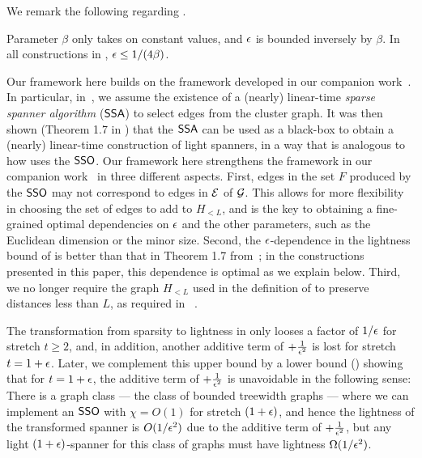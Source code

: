 We remark the following regarding .

\begin{remark}\label{remark:ACTIntro}  Parameter $\beta$ only takes on constant values, and $\epsilon$ is bounded inversely by  $\beta$. In all constructions in , $\epsilon \leq 1/(4\beta)$.
\end{remark}

Our framework here builds on the framework developed in our companion work~\cite{LS21}. In particular, in~\cite{LS21}, we assume the existence of a (nearly) linear-time \emph{sparse spanner algorithm} ($\mathsf{SSA}$) to select edges from the cluster graph.  It was then shown (Theorem 1.7 in \cite{LS21}) that the $\mathsf{SSA}$ can be used as a black-box to obtain a (nearly) linear-time construction of light spanners, in a way that is analogous to how  uses the $\mathsf{SSO}$. Our framework here strengthens the framework in our companion work~\cite{LS21} in three different aspects. First, edges in the set $F$  produced by the $\mathsf{SSO}$ may not correspond to edges in $\mathcal{E}$ of $\mathcal{G}$. This allows for more flexibility in choosing the set of edges to add to $H_{< L}$, and is the key to obtaining a fine-grained optimal dependencies on $\epsilon$ and the other parameters, such as the Euclidean dimension or the minor size. Second, the $\epsilon$-dependence in the lightness bound of  is better than that in Theorem 1.7 from~\cite{LS21}; in the constructions presented in this paper, this dependence is optimal as we explain below. Third, we no longer require the graph $H_{<L}$ used in the definition of  to preserve distances less than $L$, as required in ~\cite{LS21}. 

The transformation from sparsity to lightness in  only looses a factor of $1/\epsilon$ for stretch $t\geq 2$, and, in addition, another additive term of $+\frac{1}{\epsilon^2}$ is lost for stretch $t =  1+\epsilon$. 
Later, we complement this upper bound by  a lower bound () showing that for $t = 1+\epsilon$, the additive  term  of $+\frac{1}{\epsilon^2}$ is unavoidable in the following sense: There is a graph class --- the class of bounded treewidth graphs --- where we can implement an $\mathsf{SSO}$ with $\chi = O(1)$ for stretch $(1+\epsilon)$, and hence the lightness of the transformed spanner is $O(1/\epsilon^2)$ due to the additive term of $+\frac{1}{\epsilon^2}$, but any light $(1+\epsilon)$-spanner for this class of graphs must have lightness $\Omega(1/\epsilon^2)$.

